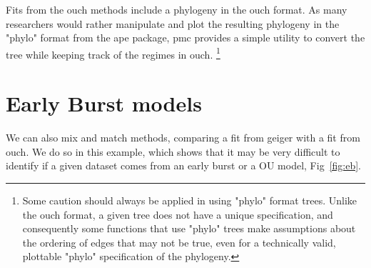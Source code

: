 \documentclass{elsarticle}
\makeatletter
\newenvironment{kframe}{%
 \def\FrameCommand##1{\hskip\@totalleftmargin \hskip-\fboxsep
 \colorbox{shadecolor}{##1}\hskip-\fboxsep
     \hskip-\linewidth \hskip-\@totalleftmargin \hskip\columnwidth}%
 \MakeFramed {\advance\hsize-\width
   \@totalleftmargin\z@ \linewidth\hsize
   \@setminipage}}%
 {\par\unskip\endMakeFramed}
\newenvironment{knitrout}{}{} %
\makeatother
\begin{document}
\begin{figure}
\begin{center}
\begin{knitrout}
{\begin{kframe}
\end{kframe}}
\end{knitrout}

\end{center}
\end{figure}


Fits from the ouch methods include a phylogeny in the ouch format.  As many researchers would rather manipulate and plot the resulting phylogeny in the "phylo" format from the ape package, pmc provides a simple utility to convert the tree while keeping track of the regimes in ouch.  \footnote{Some caution should always be applied in using "phylo" format trees.  Unlike the ouch format, a given tree does not have a unique specification, and consequently some functions that use "phylo" trees make assumptions about the ordering of edges that may not be true, even for a technically valid, plottable "phylo" specification of the phylogeny.}
%

\section{Early Burst models}
We can also mix and match methods, comparing a fit from geiger with a fit from ouch.  We do so in this example, which shows that it may be very difficult to identify if a given dataset comes from an early burst or a OU model, Fig~\ref{fig:eb}.
\end{document}
